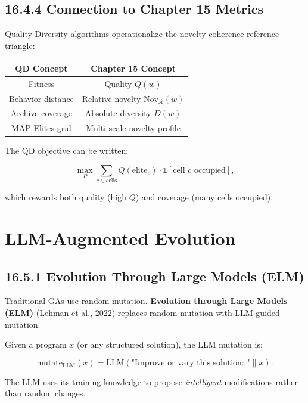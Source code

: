 \subsection{16.4.4 Connection to Chapter 15 Metrics}

Quality-Diversity algorithms operationalize the novelty-coherence-reference triangle:

\begin{center}
\begin{tabular}{cc}
\toprule
QD Concept & Chapter 15 Concept \\
\midrule
Fitness & Quality $Q(w)$ \\
Behavior distance & Relative novelty $\mathrm{Nov}_{\mathcal{R}}(w)$ \\
Archive coverage & Absolute diversity $D(w)$ \\
MAP-Elites grid & Multi-scale novelty profile \\
\bottomrule
\end{tabular}
\end{center}

The QD objective can be written:

\[\max_{P} \sum_{c \in \text{cells}} Q(\text{elite}_c) \cdot \mathbb{1}[\text{cell } c \text{ occupied}],\]

which rewards both quality (high $Q$) and coverage (many cells occupied).



\section{LLM-Augmented Evolution}

\subsection{16.5.1 Evolution Through Large Models (ELM)}

Traditional GAs use random mutation. \textbf{Evolution through Large Models (ELM)} (Lehman et al., 2022) replaces random mutation with LLM-guided mutation.

\begin{definition}
Given a program $x$ (or any structured solution), the LLM mutation is:

\[\mathrm{mutate}_{\mathrm{LLM}}(x) = \mathrm{LLM}(\text{"Improve or vary this solution: "} \| x).\]

The LLM uses its training knowledge to propose \textit{intelligent} modifications rather than random changes.
\end{definition}


